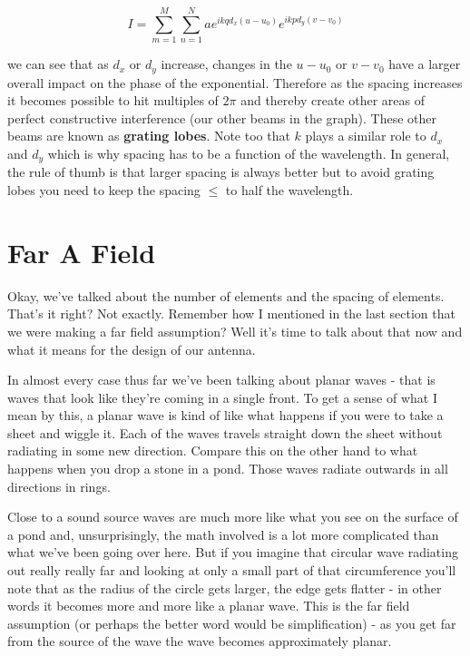 \documentclass[10pt,a5paper]{book}
\begin{document}
\begin{equation}
I=\sum_{m=1}^M \sum_{n=1}^N  ae^{ikqd_x(u-u_0)}e^{ikpd_y(v-v_0)}
\end{equation}

we can see that as $d_x$ or $d_y$ increase, changes in the $u-u_0$ or $v-v_0$ have a larger overall impact on the phase of the exponential. Therefore as the spacing increases it becomes possible to hit multiples of $2\pi$ and thereby create other areas of perfect constructive interference (our other beams in the graph). These other beams are known as \textbf{grating lobes}. Note too that $k$ plays a similar role to $d_x$ and $d_y$ which is why spacing has to be a function of the wavelength. In general, the rule of thumb is that larger spacing is always better but to avoid grating lobes you need to keep the spacing $\leq$ to half the wavelength. 

\section{Far A Field}
Okay, we've talked about the number of elements and the spacing of elements. That's it right? Not exactly. Remember how I mentioned in the last section that we were making a far field assumption? Well it's time to talk about that now and what it means for the design of our antenna. 

In almost every case thus far we've been talking about planar waves - that is waves that look like they're coming in a single front. To get a sense of what I mean by this, a planar wave is kind of like what happens if you were to take a sheet and wiggle it. Each of the waves travels straight down the sheet without radiating in some new direction. Compare this on the other hand to what happens when you drop a stone in a pond. Those waves radiate outwards in all directions in rings. 

Close to a sound source waves are much more like what you see on the surface of a pond and, unsurprisingly, the math involved is a lot more complicated than what we've been going over here. But if you imagine that circular wave radiating out really really far and looking at only a small part of that circumference you'll note that as the radius of the circle gets larger, the edge gets flatter - in other words it becomes more and more like a planar wave. This is the far field assumption (or perhaps the better word would be simplification) - as you get far from the source of the wave the wave becomes approximately planar. 
\end{document}
